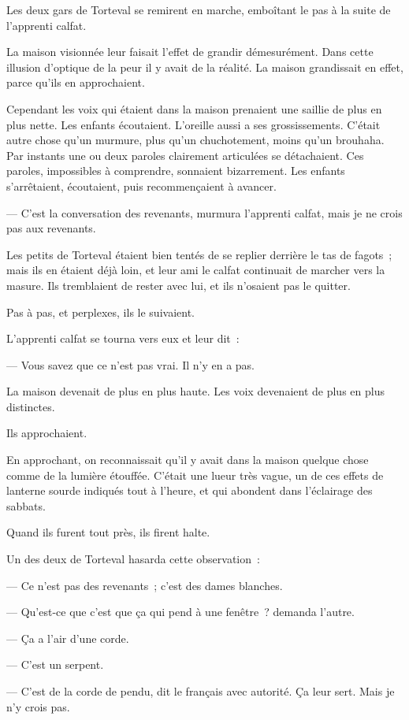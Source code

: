 \documentclass[french,twoside]{book} %
\begin{document}
Les deux gars de Torteval se remirent en marche, emboîtant le pas à la suite de l’apprenti calfat.\par
La maison visionnée leur faisait l’effet de grandir démesurément. Dans cette illusion d’optique de la peur  il y avait de la réalité. La maison grandissait en effet, parce qu’ils en approchaient.\par
Cependant les voix qui étaient dans la maison prenaient une saillie de plus en plus nette. Les enfants écoutaient. L’oreille aussi a ses grossissements. C’était autre chose qu’un murmure, plus qu’un chuchotement, moins qu’un brouhaha. Par instants une ou deux paroles clairement articulées se détachaient. Ces paroles, impossibles à comprendre, sonnaient bizarrement. Les enfants s’arrêtaient, écoutaient, puis recommençaient à avancer.\par
— C’est la conversation des revenants, murmura l’apprenti calfat, mais je ne crois pas aux revenants.\par
Les petits de Torteval étaient bien tentés de se replier derrière le tas de fagots ; mais ils en étaient déjà loin, et leur ami le calfat continuait de marcher vers la masure. Ils tremblaient de rester avec lui, et ils n’osaient pas le quitter.\par
Pas à pas, et perplexes, ils le suivaient.\par
L’apprenti calfat se tourna vers eux et leur dit :\par
— Vous savez que ce n’est pas vrai. Il n’y en a pas.\par
La maison devenait de plus en plus haute. Les voix devenaient de plus en plus distinctes.\par
Ils approchaient.\par
En approchant, on reconnaissait qu’il y avait dans la maison quelque chose comme de la lumière étouffée. C’était une lueur très vague, un de ces effets de lanterne sourde indiqués tout à l’heure, et qui abondent dans l’éclairage des sabbats.\par
Quand ils furent tout près, ils firent halte.\par
 Un des deux de Torteval hasarda cette observation :\par
— Ce n’est pas des revenants ; c’est des dames blanches.\par
— Qu’est-ce que c’est que ça qui pend à une fenêtre ? demanda l’autre.\par
— Ça a l’air d’une corde.\par
— C’est un serpent.\par
— C’est de la corde de pendu, dit le français avec autorité. Ça leur sert. Mais je n’y crois pas.\par
\end{document}
